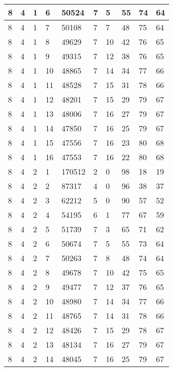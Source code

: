 \begin{table}[!ht]
\begin{tabular}{|l|l|l|l|l|l|l|l|l|l|}
        8 & 4 & 1 & 6 & 50524 & 7 & 5 & 55 & 74 & 64 \\ \hline
        8 & 4 & 1 & 7 & 50108 & 7 & 7 & 48 & 75 & 64 \\ \hline
        8 & 4 & 1 & 8 & 49629 & 7 & 10 & 42 & 76 & 65 \\ \hline
        8 & 4 & 1 & 9 & 49315 & 7 & 12 & 38 & 76 & 65 \\ \hline
        8 & 4 & 1 & 10 & 48865 & 7 & 14 & 34 & 77 & 66 \\ \hline
        8 & 4 & 1 & 11 & 48528 & 7 & 15 & 31 & 78 & 66 \\ \hline
        8 & 4 & 1 & 12 & 48201 & 7 & 15 & 29 & 79 & 67 \\ \hline
        8 & 4 & 1 & 13 & 48006 & 7 & 16 & 27 & 79 & 67 \\ \hline
        8 & 4 & 1 & 14 & 47850 & 7 & 16 & 25 & 79 & 67 \\ \hline
        8 & 4 & 1 & 15 & 47556 & 7 & 16 & 23 & 80 & 68 \\ \hline
        8 & 4 & 1 & 16 & 47553 & 7 & 16 & 22 & 80 & 68 \\ \hline
        8 & 4 & 2 & 1 & 170512 & 2 & 0 & 98 & 18 & 19 \\ \hline
        8 & 4 & 2 & 2 & 87317 & 4 & 0 & 96 & 38 & 37 \\ \hline
        8 & 4 & 2 & 3 & 62212 & 5 & 0 & 90 & 57 & 52 \\ \hline
        8 & 4 & 2 & 4 & 54195 & 6 & 1 & 77 & 67 & 59 \\ \hline
        8 & 4 & 2 & 5 & 51739 & 7 & 3 & 65 & 71 & 62 \\ \hline
        8 & 4 & 2 & 6 & 50674 & 7 & 5 & 55 & 73 & 64 \\ \hline
        8 & 4 & 2 & 7 & 50263 & 7 & 8 & 48 & 74 & 64 \\ \hline
        8 & 4 & 2 & 8 & 49678 & 7 & 10 & 42 & 75 & 65 \\ \hline
        8 & 4 & 2 & 9 & 49477 & 7 & 12 & 37 & 76 & 65 \\ \hline
        8 & 4 & 2 & 10 & 48980 & 7 & 14 & 34 & 77 & 66 \\ \hline
        8 & 4 & 2 & 11 & 48765 & 7 & 14 & 31 & 78 & 66 \\ \hline
        8 & 4 & 2 & 12 & 48426 & 7 & 15 & 29 & 78 & 67 \\ \hline
        8 & 4 & 2 & 13 & 48134 & 7 & 16 & 27 & 79 & 67 \\ \hline
        8 & 4 & 2 & 14 & 48045 & 7 & 16 & 25 & 79 & 67 \\ \hline

\end{tabular}
\end{table}
